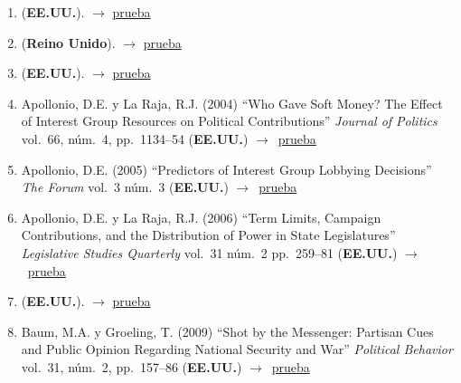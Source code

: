 \documentclass[12 pt, letter]{article}
\newenvironment{CitasMiTrabajo}{
    \begin{footnotesize}
    \begin{enumerate}[label={\footnotesize\emph{cita~\arabic*}},ref=\arabic*] %
        \setlength{\itemsep}{.1\itemsep}
        \setlength{\parskip}{.1\parskip}
    }{\end{enumerate}\end{footnotesize}}
\begin{document}
        \begin{CitasMiTrabajo}

       \item {} (\textbf{EE.UU.}).  $\rightarrow$ \href{https://www.researchgate.net/publication/269992446_What_do_representatives_produce_Work_profiles_of_representatives}{prueba}

       \item {} (\textbf{Reino Unido}).  $\rightarrow$ \href{https://link.springer.com/article/10.1057/s41293-019-00111-w}{prueba}
        
        \item {} (\textbf{EE.UU.}). $\rightarrow$ \href{https://github.com/emagar/cv/blob/master/citasMiTrab/coxMagar/aleman.calvo.networkInitiation2013ps.pdf}{prueba}

        \item Apollonio, D.E. y La Raja, R.J. (2004)
        ``Who Gave Soft Money?
        The Effect of Interest Group Resources on Political Contributions''
        \emph{Journal of Politics} vol.\ 66, n\'um.\ 4, pp.\ 1134--54  (\textbf{EE.UU.}) $\rightarrow$~\href{https://github.com/emagar/cv/blob/master/citasMiTrab/coxMagar/apolRaja.pdf}{prueba}

       \item Apollonio, D.E. (2005) ``Predictors of Interest Group Lobbying Decisions'' \emph{The Forum} vol.\ 3 n\'um.\ 3 (\textbf{EE.UU.}) $\rightarrow$~\href{https://github.com/emagar/cv/blob/master/citasMiTrab/coxMagar/Apollonio2005.pdf}{prueba}

       \item Apollonio, D.E. y La Raja, R.J. (2006) ``Term Limits, Campaign Contributions, and the Distribution of Power in State Legislatures'' \emph{Legislative Studies Quarterly} vol.\ 31 n\'um.\ 2 pp.\ 259--81 (\textbf{EE.UU.}) $\rightarrow$~\href{https://github.com/emagar/cv/blob/master/citasMiTrab/coxMagar/apollonio+laraja2006lsq.pdf}{prueba}

       \item {} (\textbf{EE.UU.}).  $\rightarrow$ \href{https://pdfs.semanticscholar.org/8717/6b94f351e0eaf1a7b8e3a92e16f6dc57a7df.pdf}{prueba}
          
        \item Baum, M.A. y Groeling, T. (2009)
        ``Shot by the Messenger: Partisan Cues and Public Opinion
        Regarding National Security and War''
        \emph{Political Behavior}  vol.\ 31, n\'um.\ 2, pp.\ 157--86 (\textbf{EE.UU.}) $\rightarrow$~\href{https://github.com/emagar/cv/blob/master/citasMiTrab/coxMagar/baum.pdf}{prueba}


\end{CitasMiTrabajo}
\end{document}
